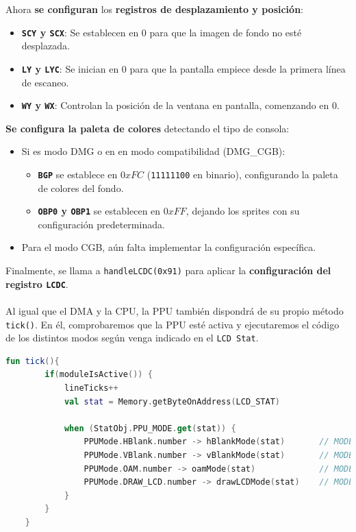 Ahora \textbf{se configuran} los \textbf{registros de desplazamiento y posición}:
\begin{itemize}
    \item \textbf{\texttt{SCY} y \texttt{SCX}}: Se establecen en $0$ para que la imagen de fondo no esté desplazada.
    \item \textbf{\texttt{LY} y \texttt{LYC}}: Se inician en $0$ para que la pantalla empiece desde la primera línea de escaneo.
    \item \textbf{\texttt{WY} y \texttt{WX}}: Controlan la posición de la ventana en pantalla, comenzando en $0$.
\end{itemize}

\textbf{Se configura la paleta de colores} detectando el tipo de consola:
\begin{itemize}
    \item Si es modo DMG o en en modo compatibilidad (DMG\_CGB):
    \begin{itemize}
        \item \textbf{\texttt{BGP}} se establece en $0xFC$ (\texttt{11111100} en binario), configurando la paleta de colores del fondo.
        \item \textbf{\texttt{OBP0} y \texttt{OBP1}} se establecen en $0xFF$, dejando los sprites con su configuración predeterminada.
    \end{itemize}
    \item Para el modo CGB, aún falta implementar la configuración específica.
\end{itemize}

Finalmente, se llama a \texttt{handleLCDC(0x91)} para aplicar la \textbf{configuración del registro \texttt{LCDC}}.
\\\\
Al igual que el DMA y la CPU, la PPU también dispondrá de su propio método \texttt{tick()}. En él, comprobaremos que la PPU esté activa y ejecutaremos el código de los distintos modos según venga indicado en el \texttt{LCD Stat}.

\begin{lstlisting}[language=Kotlin, caption={Lógica principal de la PPU.}, label={code:pputick}]
    fun tick(){
        if(moduleIsActive()) {
            lineTicks++
            val stat = Memory.getByteOnAddress(LCD_STAT)

            when (StatObj.PPU_MODE.get(stat)) {
                PPUMode.HBlank.number -> hBlankMode(stat)       // MODE 0
                PPUMode.VBlank.number -> vBlankMode(stat)       // MODE 1
                PPUMode.OAM.number -> oamMode(stat)             // MODE 2
                PPUMode.DRAW_LCD.number -> drawLCDMode(stat)    // MODE 3
            }
        }
    }
\end{lstlisting}

